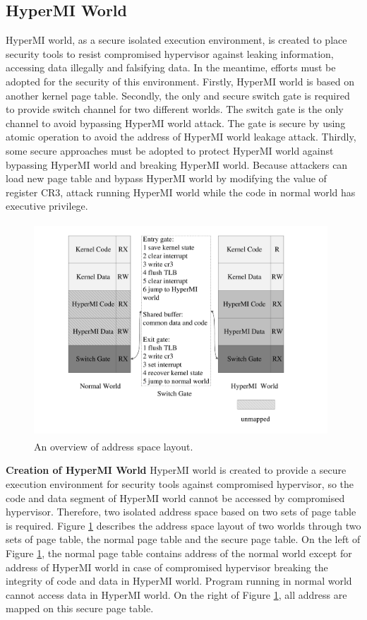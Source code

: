 \documentclass[conference]{IEEEtran}
\begin{document}
\subsection{HyperMI World} \label {HWorld}
HyperMI world, as a secure isolated execution environment, is created to place security tools to resist compromised hypervisor against leaking information, accessing data illegally and falsifying data. In the meantime, efforts must be adopted for the security of this environment. Firstly, HyperMI world is based on another kernel page table. Secondly, the only and secure switch gate is required to provide switch channel for two different worlds. The switch gate is the only channel to avoid bypassing HyperMI world attack. The gate is secure by using atomic operation to avoid the address of HyperMI world leakage attack. Thirdly, some secure approaches must be adopted to protect HyperMI world against bypassing HyperMI world and breaking HyperMI world. Because attackers can load new page table and bypass HyperMI world by modifying the value of register CR3, attack running HyperMI world while the code in normal world has executive privilege.
\begin{figure}
\centerline{\includegraphics[width=11cm, height=8cm]{pdfvmcs2.pdf}}%
\caption{An overview of address space layout.} \label{fig2}
\end{figure}
\textbf{Creation of HyperMI World}
HyperMI world is created to provide a secure execution environment for security tools against compromised hypervisor, so the code and data segment of HyperMI world cannot be accessed by compromised hypervisor. Therefore, two isolated address space based on two sets of page table is required.
Figure \ref{fig2} describes the address space layout of two worlds through two sets of page table, the normal page table and the secure page table. On the left of Figure \ref{fig2}, the normal page table contains address of the normal world except for address of HyperMI world in case of compromised hypervisor breaking the integrity of code and data in HyperMI world. Program running in normal world cannot access data in HyperMI world. On the right of Figure \ref{fig2}, all address are mapped on this secure page table.
\end{document}
